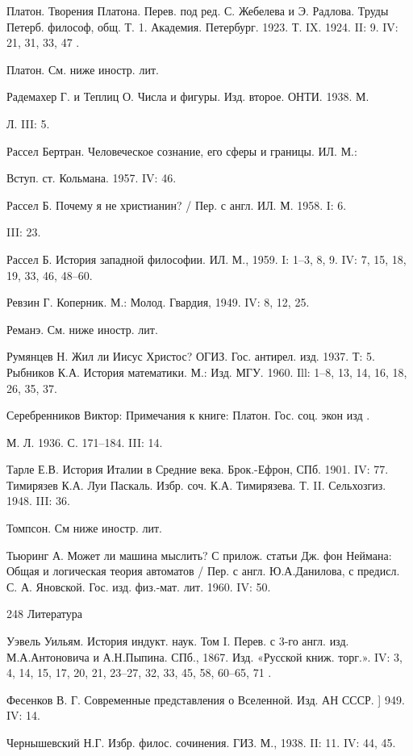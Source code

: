 Платон. Творения  Платона. Перев. под  ред. С. Жебелева и  Э. Радлова.
Труды Петерб.  философ, общ. Т.  1. Академия. Петербург. 1923.  Т. IX.
1924. II: 9. IV: 21, 31, 33, 47                                      .

Платон. См. ниже иностр. лит.

Радемахер Г. и Теплиц О. Числа и фигуры. Изд. второе. ОНТИ. 1938. М.

Л. III: 5.

Рассел Бертран. Человеческое сознание, его сферы и границы. ИЛ. М.:

Вступ. ст. Кольмана. 1957. IV: 46.

Рассел Б. Почему я не христианин? / Пер. с англ. ИЛ. М. 1958. I: 6.

III: 23.

Рассел Б. История западной философии. ИЛ. М., 1959. I: 1--3, 8, 9. IV:
7, 15, 18, 19, 33, 46, 48--60.

Ревзин Г. Коперник. М.: Молод. Гвардия, 1949. IV: 8, 12, 25.

Реманэ. См. ниже иностр. лит.

Румянцев Н. Жил ли Иисус Христос? ОГИЗ. Гос. антирел. изд. 1937. Т: 5.
Рыбников К.А. История  математики. М.: Изд. МГУ. 1960.  Ill: 1--8, 13,
14, 16, 18, 26, 35, 37.

Серебренников Виктор: Примечания к книге: Платон. Гос. соц. экон изд .

М. Л. 1936. С. 171--184. III: 14.

Тарле Е.В. История Италии в  Средние века. Брок.-Ефрон, СПб. 1901. IV:
77. Тимирязев  К.А. Луи  Паскаль. Избр. соч.  К.А. Тимирязева.  Т. II.
Сельхозгиз. 1948. III: 36.

Томпсон. См ниже иностр. лит.

Тьюринг А. Может ли машина мыслить?  С прилож. статьи Дж. фон Неймана:
Общая и  логическая теория  автоматов / Пер.  с англ.  Ю.А.Данилова, с
предисл. С. А. Яновской. Гос. изд. физ.-мат. лит. 1960. IV: 50.

248 Литература

Уэвель Уильям. История  индукт. наук. Том I. Перев. с  3-го англ. изд.
М.А.Антоновича и  А.Н.Пыпина. СПб., 1867. Изд.  «Русской книж. торг.».
IV: 3, 4, 14, 15, 17, 20, 21, 23--27, 32, 33, 45, 58, 60--65, 71     .

Фесенков В. Г. Современные представления  о Вселенной. Изд. АН СССР. ]
949. IV: 14.

Чернышевский Н.Г. Избр.  филос. сочинения. ГИЗ. М., 1938.  II: 11. IV:
44, 45.

